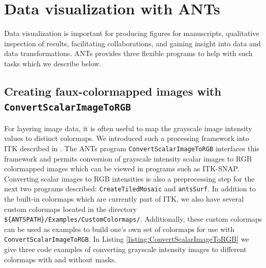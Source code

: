\documentclass{InsightArticle}
\begin{document}
%
%



\newpage
\section{Data visualization with ANTs}
Data visualization is important for producing figures for manuscripts,
qualitative inspection of results, facilitating collaborations, and 
gaining insight into data and data transformations.  ANTs provides three
flexible programs to help with such tasks which we describe below.

\subsection{Creating faux-colormapped images with {\tt ConvertScalarImageToRGB}}
For layering image data, it is often useful to map the grayscale image intensity
values to distinct colormaps.  We introduced such a processing framework into
ITK described in \cite{Tustison2008c}.  The ANTs program {\tt ConvertScalarImageToRGB}
interfaces this framework and permits conversion of grayscale intensity scalar images
to RGB colormapped images which can be viewed in programs such as ITK-SNAP.  
Converting scalar images to RGB intensities is also a preprocessing step for 
the next two programs described:  {\tt CreateTiledMosaic} and {\tt antsSurf}.
In addition to the built-in colormaps which are currently part of ITK, we also 
have several custom colormaps located in the directory 
\verb#${ANTSPATH}/Examples/CustomColormaps/#.  Additionally, these custom colormaps
can be used as examples to build one's own set of colormaps for use with
{\tt ConvertScalarImageToRGB}. In Listing \ref{listing:ConvertScalarImageToRGB} we
give three code examples of converting grayscale intensity images to different 
colormaps with and without masks.
\end{document}
